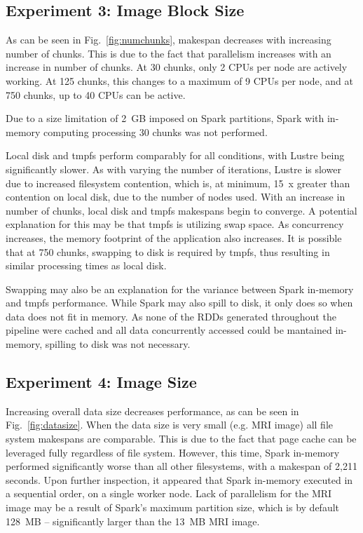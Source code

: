 \subsection{Experiment 3: Image Block Size}

As can be seen in Fig.~\ref{fig:numchunks}, makespan decreases with increasing
number of chunks. This is due to the fact that parallelism 
increases with an increase in number of chunks. At 30 chunks, 
only 2 CPUs per node are actively working. At 125 chunks, this changes 
to a maximum of 9 CPUs per node, and at 750 chunks, up to 40 CPUs can be 
active.

Due to a size limitation of 2~GB imposed on Spark partitions, Spark with in-memory
computing processing 30 chunks was not performed.

Local disk and tmpfs perform comparably for all 
conditions, with Lustre being significantly slower. As with varying the number 
of iterations, Lustre is slower due to increased filesystem contention, which 
is, at minimum, 15~x greater than contention on local disk, due to the number of nodes
used. With an increase in 
number of chunks, local disk and tmpfs makespans begin to converge. A potential 
explanation for this may be that tmpfs is utilizing swap space. As concurrency 
increases, the memory footprint of the application also increases. It is 
possible that at 750 chunks, swapping to disk is required by tmpfs, thus 
resulting in similar processing times as local disk.


Swapping may also be an explanation for the variance between Spark in-memory 
and tmpfs performance. While Spark may also spill to disk, it only does so when
data does not fit in memory. As none of the RDDs generated throughout the 
pipeline were cached and all data concurrently accessed could be mantained 
in-memory, spilling to disk was not necessary.

\subsection{Experiment 4: Image Size}

Increasing overall data size decreases performance, as can be seen in 
Fig.~\ref{fig:datasize}. When the data size is very small (e.g. MRI image) all 
file system makespans are comparable. This is due to the 
fact that page cache can be leveraged fully regardless of file system. However, 
this time, Spark in-memory performed significantly worse than all other 
filesystems, with a makespan of 2,211 seconds. Upon further inspection,
it appeared that Spark in-memory executed
in a sequential order, on a single worker node. Lack of parallelism for the MRI 
image may be a result of Spark's maximum partition size, which is by default 128~MB
-- significantly larger than the 13~MB MRI image. 

